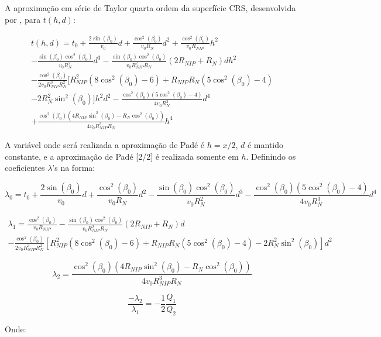 A aproximação em série de Taylor quarta ordem da superfície CRS, desenvolvida por \cite{germam}, para $t(h,d)$:

\begin{multline}
\label{eq:6.13}
 t(h,d)=t_0+\frac{2\sin(\beta_0)}{v_0}d+\frac{\cos^2(\beta_0)}{v_0R_N}d^2+\frac{\cos^2(\beta_0)}{v_0R_{NIP}}h^2 \\
 -\frac{\sin(\beta_0)\cos^2(\beta_0)}{v_0R_N^2}d^3-\frac{\sin(\beta_0)\cos^2(\beta_0)}{v_0R_{NIP}^2R_N}(2R_{NIP}+R_N)dh^2 \\
 -\frac{\cos^2(\beta_0)}{2v_0R_{NIP}^3R_N^2}[R_{NIP}^2(8\cos^2(\beta_0)-6)+R_{NIP}R_N(5\cos^2(\beta_0)-4) \\
 -2R_N^2\sin^2(\beta_0)]h^2d^2-\frac{\cos^2(\beta_0)(5\cos^2(\beta_0)-4)}{4v_0R_N^3}d^4 \\
 +\frac{\cos^2(\beta_0)(4R_{NIP}\sin^2(\beta_0)-R_N\cos^2(\beta_0))}{4v_0R_{NIP}^3R_N}h^4 
\end{multline}

A variável onde será realizada a aproximação de Padé é $h=x/2$,
$d$ é mantido constante, e a aproximação de Padé [2/2] é realizada somente em $h$.
Definindo os coeficientes $\lambda$'s na forma:

\begin{equation}
\label{eq:6.14}
 \lambda_0=t_0+\frac{2\sin(\beta_0)}{v_0}d+\frac{\cos^2(\beta_0)}{v_0R_N}d^2-\frac{\sin(\beta_0)\cos^2(\beta_0)}{v_0R_N^2}d^3-\frac{\cos^2(\beta_0)(5\cos^2(\beta_0)-4)}{4v_0R_N^3}d^4
\end{equation}

\begin{multline}
\label{eq:6.15}
 \lambda_1=\frac{\cos^2(\beta_0)}{v_0R_{NIP}}-\frac{\sin(\beta_0)\cos^2(\beta_0)}{v_0R_{NIP}^2R_N}(2R_{NIP}+R_N)d \\
  -\frac{\cos^2(\beta_0)}{2v_0R_{NIP}^3R_N^2}[R_{NIP}^2(8\cos^2(\beta_0)-6)+R_{NIP}R_N(5\cos^2(\beta_0)-4)-2R_N^2\sin^2(\beta_0)]d^2
\end{multline}

\begin{equation}
\label{eq:6.16}
  \lambda_2=\frac{\cos^2(\beta_0)(4R_{NIP}\sin^2(\beta_0)-R_N\cos^2(\beta_0))}{4v_0R_{NIP}^3R_N}
\end{equation}

\begin{equation}
\label{eq:6.17}
  \frac{-\lambda_2}{\lambda_1}=-\frac{1}{2}\frac{Q_1}{Q_2}       
\end{equation}

Onde:

